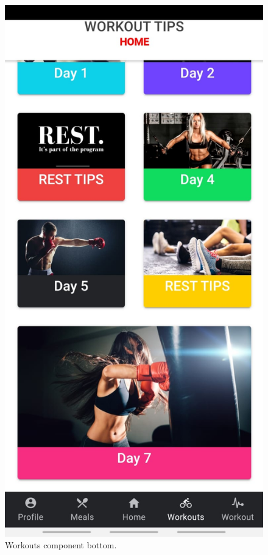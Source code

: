 \documentclass[a4paper,12pt]{report}
\begin{document}
\begin{figure}[ht]
\begin{minipage}[b]{0.5\linewidth}
    \includegraphics[width=.7\linewidth]{images/aplicationImages/workoutBottom.jpeg} 
    \caption{Workouts component bottom.} 
    \vspace{4ex}
  \end{minipage} 
  \begin{minipage}[b]{0.5\linewidth}
    \centering

\end{minipage}
\end{figure}
\end{document}
